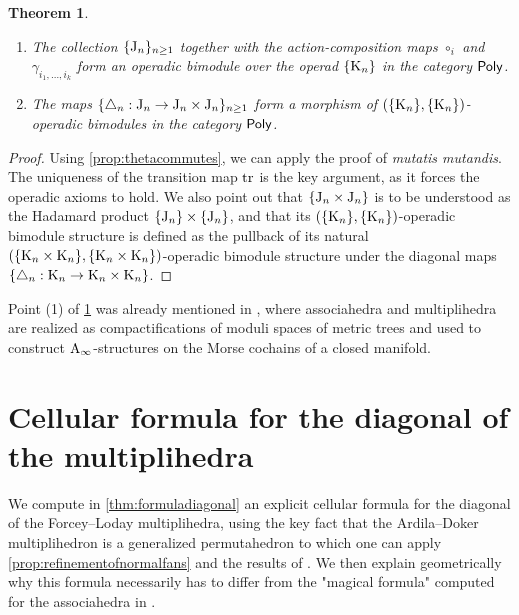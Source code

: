 \documentclass[twoside, 12pt]{amsart}
\newtheorem{theorem}{Theorem}
\theoremstyle{remark}
\begin{document}
\begin{theorem}\label{thm:MainOperad}\leavevmode
\begin{enumerate}[leftmargin=*]
\item The collection $\{\mathrm{J}_n\}_{n\geq 1}$ together with the action-composition maps $\circ_i$ and $\gamma_{i_1,\ldots,i_k}$ form an operadic bimodule over the operad $\{\mathrm{K}_n\}$ in the category $\mathsf{Poly}$. 

\item The maps $\{\triangle_n : \mathrm{J}_n \to \mathrm{J}_n\times \mathrm{J}_n\}_{n\geq 1}$ form a morphism of $(\{\mathrm{K}_n\},\{\mathrm{K}_n\})$-operadic bimodules in the category $\mathsf{Poly}$. 
\end{enumerate}
\end{theorem}

\begin{proof}
Using \cref{prop:thetacommutes}, we can apply the proof of \cite[Theorem~1]{MTTV19} \emph{mutatis mutandis}. The uniqueness of the transition map $\mathrm{tr}$ is the key argument, as it forces the operadic axioms to hold. We also point out that $\{ \mathrm{J}_n\times \mathrm{J}_n \}$ is to be understood as the Hadamard product $\{ \mathrm{J}_n \} \times \{ \mathrm{J}_n \}$, and that its $(\{\mathrm{K}_n\},\{\mathrm{K}_n\})$-operadic bimodule structure is defined as the pullback of its natural $(\{\mathrm{K}_n \times \mathrm{K}_n\},\{\mathrm{K}_n \times \mathrm{K}_n\})$-operadic bimodule structure under the diagonal maps $\{ \triangle_n : \mathrm{K}_n \to \mathrm{K}_n \times \mathrm{K}_n \}$.
\end{proof}

Point (1) of \cref{thm:MainOperad} was already mentioned in \cite[I, Section 1.2]{Mazuir21}, where associahedra and multiplihedra are realized as compactifications of moduli spaces of metric trees and used to construct $\mathrm{A}_\infty$-structures on the Morse cochains of a closed manifold.


\section{Cellular formula for the diagonal of the multiplihedra} \label{sec:III}

We compute in \cref{thm:formuladiagonal} an explicit cellular formula for the diagonal of the Forcey--Loday multiplihedra, using the key fact that the Ardila--Doker multiplihedron is a generalized permutahedron to which one can apply \cref{prop:refinementofnormalfans} and the results of \cite{LA21}. We then explain geometrically why this formula necessarily has to differ from the "magical formula" computed for the associahedra in \cite{MTTV19}.
\end{document}
